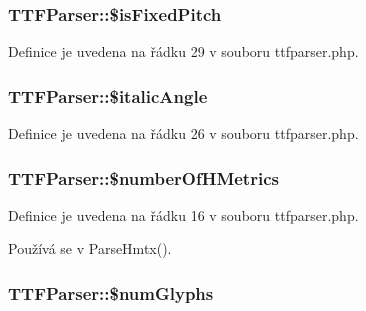 \hypertarget{class_t_t_f_parser_a939aa940d419002839e55f20ffd34b0a}{
\subsubsection[{\$is\-Fixed\-Pitch}]{\setlength{\rightskip}{0pt plus 5cm}T\-T\-F\-Parser\-::\$is\-Fixed\-Pitch}}\label{class_t_t_f_parser_a939aa940d419002839e55f20ffd34b0a}


Definice je uvedena na řádku 29 v souboru ttfparser.\-php.

\hypertarget{class_t_t_f_parser_a00bf745d03b39f24fb36f94f14083d62}{
\subsubsection[{\$italic\-Angle}]{\setlength{\rightskip}{0pt plus 5cm}T\-T\-F\-Parser\-::\$italic\-Angle}}\label{class_t_t_f_parser_a00bf745d03b39f24fb36f94f14083d62}


Definice je uvedena na řádku 26 v souboru ttfparser.\-php.

\hypertarget{class_t_t_f_parser_a279359ab6abedfa1809311857245138f}{
\subsubsection[{\$number\-Of\-H\-Metrics}]{\setlength{\rightskip}{0pt plus 5cm}T\-T\-F\-Parser\-::\$number\-Of\-H\-Metrics}}\label{class_t_t_f_parser_a279359ab6abedfa1809311857245138f}


Definice je uvedena na řádku 16 v souboru ttfparser.\-php.



Používá se v Parse\-Hmtx().

\hypertarget{class_t_t_f_parser_a6e663eabf186f7a15d60fdbd57974693}{
\subsubsection[{\$num\-Glyphs}]{\setlength{\rightskip}{0pt plus 5cm}T\-T\-F\-Parser\-::\$num\-Glyphs}}\label{class_t_t_f_parser_a6e663eabf186f7a15d60fdbd57974693}



